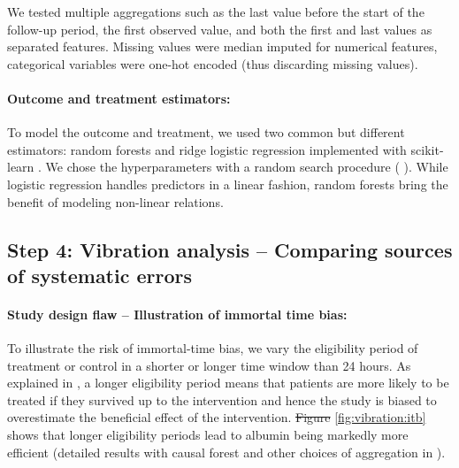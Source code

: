 \documentclass[10pt,letterpaper]{article}
\providecommand{\DIFaddtex}[1]{{\protect\color{blue}\uwave{#1}}} %
\providecommand{\DIFdeltex}[1]{{\protect\color{red}\sout{#1}}}                      %
\providecommand{\DIFaddbegin}{} %
\providecommand{\DIFaddend}{} %
\providecommand{\DIFdelbegin}{} %
\providecommand{\DIFdelend}{} %
\providecommand{\DIFadd}[1]{\texorpdfstring{\DIFaddtex{#1}}{#1}} %
\providecommand{\DIFdel}[1]{\texorpdfstring{\DIFdeltex{#1}}{}} %
\newcommand{\DIFscaledelfig}{0.5}
\newlength{\DIFdelgraphicswidth} %
\newlength{\DIFdelgraphicsheight} %
\newcommand{\DIFaddincludegraphics}[2][]{{\color{blue}\fbox{\DIFOincludegraphics[#1]{#2}}}} %
\newcommand{\DIFdelincludegraphics}[2][]{%
\sbox{\DIFdelgraphicsbox}{\DIFOincludegraphics[#1]{#2}}%
\settoboxwidth{\DIFdelgraphicswidth}{\DIFdelgraphicsbox} %
\settoboxtotalheight{\DIFdelgraphicsheight}{\DIFdelgraphicsbox} %
\scalebox{\DIFscaledelfig}{%
\parbox[b]{\DIFdelgraphicswidth}{\usebox{\DIFdelgraphicsbox}\\[-\baselineskip] \rule{\DIFdelgraphicswidth}{0em}}\llap{\resizebox{\DIFdelgraphicswidth}{\DIFdelgraphicsheight}{%
\setlength{\unitlength}{\DIFdelgraphicswidth}%
\begin{picture}(1,1)%
\thicklines\linethickness{2pt} %
{\color[rgb]{1,0,0}\put(0,0){\framebox(1,1){}}}%
{\color[rgb]{1,0,0}\put(0,0){\line( 1,1){1}}}%
{\color[rgb]{1,0,0}\put(0,1){\line(1,-1){1}}}%
\end{picture}%
}\hspace*{3pt}}} %
} %
\DeclareRobustCommand{\DIFaddbegin}{\DIFOaddbegin \let\includegraphics\DIFaddincludegraphics} %
\DeclareRobustCommand{\DIFaddend}{\DIFOaddend \let\includegraphics\DIFOincludegraphics} %
\DeclareRobustCommand{\DIFdelbegin}{\DIFOdelbegin \let\includegraphics\DIFdelincludegraphics} %
\DeclareRobustCommand{\DIFdelend}{\DIFOaddend \let\includegraphics\DIFOincludegraphics} %
\begin{document}
We tested multiple aggregations such as the last value before the start of the
follow-up period, the first observed value, and both the first and last values
as separated features. Missing values were median imputed for numerical
features, categorical variables were one-hot encoded (thus discarding missing values).


\paragraph{Outcome and treatment estimators:}

To model the outcome and treatment, we used two common but different
estimators: random forests and ridge logistic regression implemented with scikit-learn
\cite{pedregosa2011scikit}. We chose the
hyperparameters with a random search procedure (\DIFdelbegin %
\DIFdelend \DIFaddbegin \DIFadd{S5 Appendix}\DIFaddend ). While logistic regression handles
predictors in a linear fashion, random forests bring the benefit of modeling
non-linear relations.


\subsection*{Step 4: Vibration analysis -- Comparing sources of systematic errors}%
\label{sec:vibration_analysis_mimic_iv}


\paragraph{Study design flaw -- Illustration of immortal time bias:}

To illustrate the risk of immortal-time bias, we vary the eligibility period of
treatment or control in a shorter or longer time window than 24 hours. As
explained in \DIFdelbegin %
\DIFdelend \DIFaddbegin {}\DIFaddend , a longer eligibility period means that
patients are more likely to be treated if they survived up to the intervention
and hence the study is biased to overestimate the beneficial effect of the
intervention. \DIFdelbegin \DIFdel{Figure }\DIFdelend \DIFaddbegin \DIFadd{Fig }\DIFaddend \ref{fig:vibration:itb} shows that longer eligibility
periods lead to albumin being markedly more efficient (detailed results with causal forest and other choices of aggregation in \DIFdelbegin %
\DIFdelend \DIFaddbegin \DIFadd{S8 Fig}\DIFaddend ).
\end{document}

